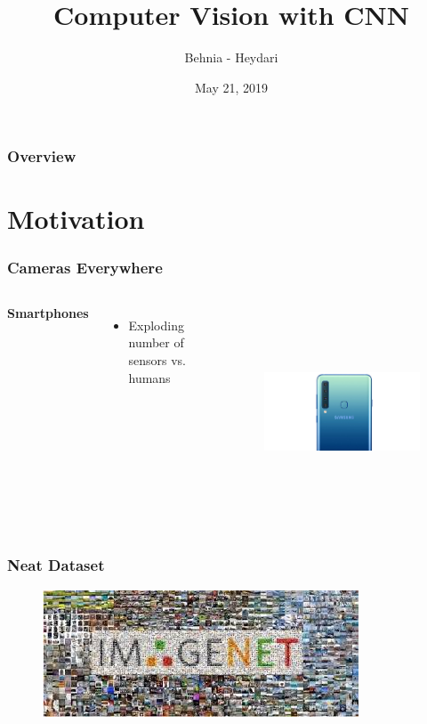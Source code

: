 \documentclass{beamer}
\title[CNNs]{Computer Vision with CNN}
\author{Behnia - Heydari}
\institute[AUT]
{
Amirkabir University of Technology \\ 
\medskip
\textit{}
}
\date{May 21, 2019}
\begin{document}
\begin{frame}
\titlepage
\end{frame}

\begin{frame}
\frametitle{Overview}
\tableofcontents
\end{frame}

\section{Motivation}

\begin{frame}
\frametitle{Cameras Everywhere}
\begin{columns}[c]

\textbf{Smartphones}
\begin{itemize}
\item Exploding number of sensors vs. humans

\end{itemize}

\begin{figure}
	\includegraphics[height=180pt]{Pics/samsung.jpg}
\end{figure}
\end{columns}
\end{frame}

\begin{frame}
	\frametitle{Neat Dataset}
	\begin{figure}
		\includegraphics[width=\linewidth]{Pics/image_net.jpeg}
	\end{figure}
\end{frame}
\end{document}
